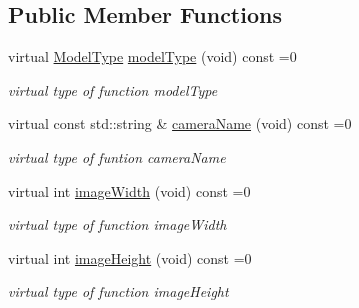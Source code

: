\subsection*{Public Member Functions}
\begin{DoxyCompactItemize}
\item 
\mbox{\label{classcamodocal_1_1Camera_aa95c0a2dd8d36b4d5aa7013eb01d1227}} 
virtual \hyperlink{classcamodocal_1_1Camera_a663bb19b7b1f38f6d1b7eeb0890183ff}{Model\+Type} \hyperlink{classcamodocal_1_1Camera_aa95c0a2dd8d36b4d5aa7013eb01d1227}{model\+Type} (void) const =0
\begin{DoxyCompactList}\small\item\em virtual type of function model\+Type \end{DoxyCompactList}\item 
\mbox{\label{classcamodocal_1_1Camera_ad0a7aafcfd19a6105f3b64f003f0f794}} 
virtual const std\+::string \& \hyperlink{classcamodocal_1_1Camera_ad0a7aafcfd19a6105f3b64f003f0f794}{camera\+Name} (void) const =0
\begin{DoxyCompactList}\small\item\em virtual type of funtion camera\+Name \end{DoxyCompactList}\item 
\mbox{\label{classcamodocal_1_1Camera_ad9e799c94b0fddad3f982c30820d7bab}} 
virtual int \hyperlink{classcamodocal_1_1Camera_ad9e799c94b0fddad3f982c30820d7bab}{image\+Width} (void) const =0
\begin{DoxyCompactList}\small\item\em virtual type of function image\+Width \end{DoxyCompactList}\item 
\mbox{\label{classcamodocal_1_1Camera_a2a829050957309327b163e460df32a3d}} 
virtual int \hyperlink{classcamodocal_1_1Camera_a2a829050957309327b163e460df32a3d}{image\+Height} (void) const =0
\begin{DoxyCompactList}\small\item\em virtual type of function image\+Height \end{DoxyCompactList}\item 
\mbox{\label{classcamodocal_1_1Camera_a1c74aa165487ef4eea0d11ded7946ad1}} 

\end{DoxyCompactItemize}
